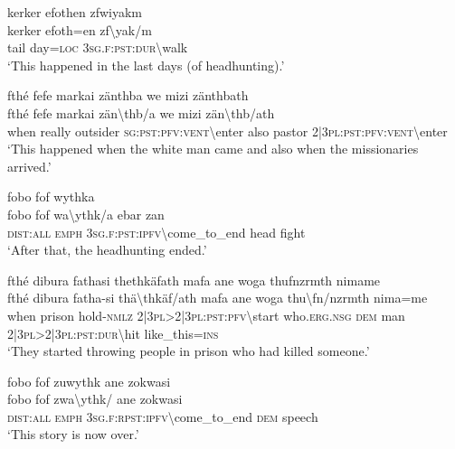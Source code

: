 \ea\label{ex:4:a1824}
kerker efothen zfwiyakm\\
\gll kerker	efoth=en	zf{\textbackslash}yak/m\\
     tail	day=\textsc{loc}	3\textsc{sg}.\textsc{f}:\textsc{pst}:\textsc{dur}{\textbackslash}walk\\
\glt `This happened in the last days (of headhunting).'
\z

\ea\label{ex:4:a1825}
fthé fefe markai zänthba we mizi zänthbath\\
\gll fthé	fefe	markai	zän{\textbackslash}thb/a	we	mizi	zän{\textbackslash}thb/ath\\
     when	really	outsider	\textsc{sg}:\textsc{pst}:\textsc{pfv}:\textsc{vent}{\textbackslash}enter	also	pastor	2|3\textsc{pl}:\textsc{pst}:\textsc{pfv}:\textsc{vent}{\textbackslash}enter\\
\glt `This happened when the white man came and also when the missionaries arrived.'
\z

\ea\label{ex:4:a1827}
fobo fof wythka\\
\gll fobo	fof	wa{\textbackslash}ythk/a	ebar	zan\\
     \textsc{dist}:\textsc{all}	\textsc{emph}	3\textsc{sg}.\textsc{f}:\textsc{pst}:\textsc{ipfv}{\textbackslash}come\_to\_end	head	fight\\
\glt `After that, the headhunting ended.'
\z

\ea\label{ex:4:a1828}
fthé dibura fathasi thethkäfath mafa ane woga thufnzrmth nimame\\
\gll fthé	dibura	fatha-si	thä{\textbackslash}thkäf/ath	mafa	ane	woga	thu{\textbackslash}fn/nzrmth	nima=me\\
     when	prison	hold-\textsc{nmlz}	2|3\textsc{pl}>2|3\textsc{pl}:\textsc{pst}:\textsc{pfv}{\textbackslash}start	who.\textsc{erg}.\textsc{nsg}	\textsc{dem}	man	2|3\textsc{pl}>2|3\textsc{pl}:\textsc{pst}:\textsc{dur}{\textbackslash}hit	like\_this=\textsc{ins}\\
\glt `They started throwing people in prison who had killed someone.'
\z

\ea\label{ex:4:a1830}
fobo fof zuwythk ane zokwasi\\
\gll fobo	fof	zwa{\textbackslash}ythk/	ane	zokwasi\\
     \textsc{dist}:\textsc{all}	\textsc{emph}	3\textsc{sg}.\textsc{f}:\textsc{rpst}:\textsc{ipfv}{\textbackslash}come\_to\_end	\textsc{dem}	speech\\
\glt `This story is now over.'
\z
